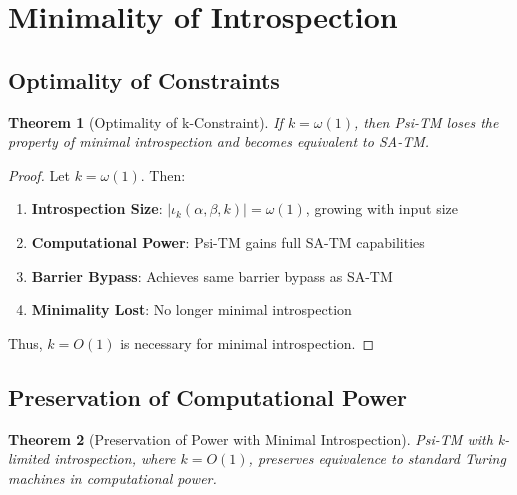 \documentclass[11pt]{article}
\newtheorem{theorem}{Theorem}
\begin{document}
\section{Minimality of Introspection}

\subsection{Optimality of Constraints}

\begin{theorem}[Optimality of k-Constraint]
If $k = \omega(1)$, then Psi-TM loses the property of minimal introspection and becomes equivalent to SA-TM.
\end{theorem}

\begin{proof}
Let $k = \omega(1)$. Then:

\begin{enumerate}
\item \textbf{Introspection Size}: $|\iota_k(\alpha, \beta, k)| = \omega(1)$, growing with input size
\item \textbf{Computational Power}: Psi-TM gains full SA-TM capabilities
\item \textbf{Barrier Bypass}: Achieves same barrier bypass as SA-TM
\item \textbf{Minimality Lost}: No longer minimal introspection
\end{enumerate}

Thus, $k = O(1)$ is necessary for minimal introspection.
\end{proof}

\subsection{Preservation of Computational Power}

\begin{theorem}[Preservation of Power with Minimal Introspection]
Psi-TM with k-limited introspection, where $k = O(1)$, preserves equivalence to standard Turing machines in computational power.
\end{theorem}
\end{document}
